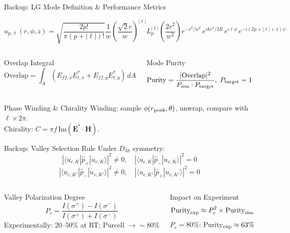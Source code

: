 \documentclass[aspectratio=169, 10pt]{beamer}
\begin{document}
\begin{frame}{Backup: LG Mode Definition \& Performance Metrics}

  \[ u_{p,\ell}(r,\phi,z) = \sqrt{\frac{2p!}{\pi(p+|\ell|)!}} \frac{1}{w}\!\left(\frac{\sqrt{2}r}{w}\right)^{|\ell|} L_p^{|\ell|}\!\!\left(\frac{2r^2}{w^2}\right) e^{-r^2/w^2}\,e^{ikr^2/2R}\,e^{i\ell\phi}\,e^{-i(2p+|\ell|+1)\psi} \]

  \begin{columns}[T]
      \begin{block}{Overlap Integral}
        \[ \text{Overlap}=\int_A(E_{ff,x}E_{t,x}^*+E_{ff,y}E_{t,y}^*)\,dA \]
      \end{block}
      \begin{block}{Mode Purity}
        \[ \text{Purity}=\frac{|\text{Overlap}|^2}{P_{\rm sim}\cdot P_{\rm target}},\;P_{\rm target}=1 \]
      \end{block}
  \end{columns}
  \vspace{1pt}
  \begin{block}{Phase Winding \& Chirality}
    Winding: sample $\phi(r_{\rm peak},\theta)$, unwrap, compare with $\ell\times2\pi$.\\
    Chirality: $C=\pi f\,\mathrm{Im}(\mathbf{E}^*\cdot\mathbf{H})$.
  \end{block}
\end{frame}

  

\begin{frame}{Backup: Valley Selection Rule}
  Under $D_{3h}$ symmetry:
  \[ |\langle u_{c,K}|\hat{p}_+|u_{v,K}\rangle|^2\neq0,\quad |\langle u_{c,K}|\hat{p}_-|u_{v,K}\rangle|^2=0 \]
  \[ |\langle u_{c,K'}|\hat{p}_-|u_{v,K'}\rangle|^2\neq0,\quad |\langle u_{c,K'}|\hat{p}_+|u_{v,K'}\rangle|^2=0 \]
  \begin{columns}[T]
      \begin{block}{Valley Polarization Degree}
        \[ P_c=\frac{I(\sigma^+)-I(\sigma^-)}{I(\sigma^+)+I(\sigma^-)} \]
        Experimentally: 20--50\% at RT; Purcell $\to\sim80\%$
      \end{block}
      \begin{alertblock}{Impact on Experiment}
        \[ \text{Purity}_{\rm exp}\approx P_c^2\times\text{Purity}_{\rm sim} \]
        $P_c=80\%$: Purity$_{\rm exp}\approx63\%$
      \end{alertblock}
  \end{columns}
\end{frame}
\end{document}
